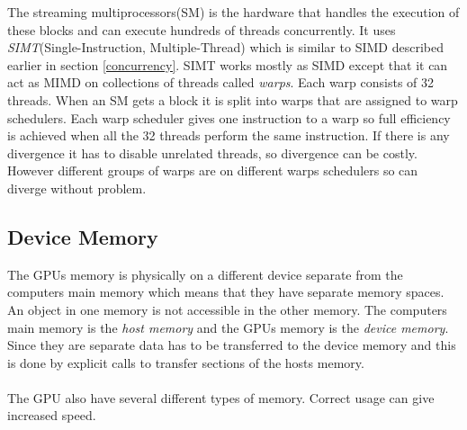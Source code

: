 \documentclass[10pt,a4paper]{report}
\begin{document}
The streaming multiprocessors(SM) is the hardware that handles the execution of these blocks and can execute hundreds of threads concurrently. It uses \emph{SIMT}(Single-Instruction, Multiple-Thread) which is similar to SIMD described earlier in section \ref{concurrency}. SIMT works mostly as SIMD except that it can act as MIMD on collections of threads called \emph{warps}. Each warp consists of 32 threads. When an SM gets a block it is split into warps that are assigned to warp schedulers. Each warp scheduler gives one instruction to a warp so full efficiency is achieved when all the 32 threads perform the same instruction. If there is any divergence it has to disable unrelated threads, so divergence can be costly. However different groups of warps are on different warps schedulers so can diverge without problem.\cite{cuda}

\subsection{Device Memory}
The GPUs memory is physically on a different device separate from the computers main memory which means that they have separate memory spaces. An object in one memory is not accessible in the other memory. The computers main memory is the \emph{host memory} and the GPUs memory is the \emph{device memory}. Since they are separate data has to be transferred to the device memory and this is done by explicit calls to transfer sections of the hosts memory.\cite{cuda}\\
\\
The GPU also have several different types of memory\cite{cuda}. Correct usage can give increased speed\cite{cuda, cuda_best_practice}.
\end{document}
